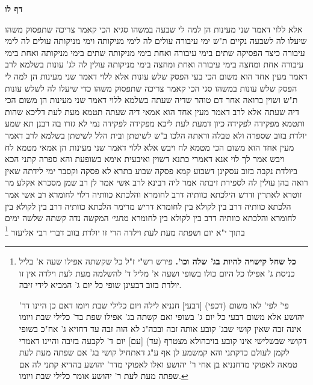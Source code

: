 \documentclass[12pt, openany]{book}
\newcommand{\sethebfont}{
\fontsize{10.5pt}{21.0pt} \selectfont
}
\newcommand{\twocol}[1]{
	{\sethebfont \begin{multicols}{2}
			#1
	\end{multicols}}	
}
\newcommand{\sectname}{}
\newcommand{\newsection}[1]{
	\addcontentsline{toc}{section}{#1}
	\renewcommand{\sectname}{#1}	
	\vspace{-\baselineskip}
	\begin{center}
		\textbf{%
\fontsize{16pt}{16pt}\selectfont
			#1}
	\end{center}
	\vspace{-\baselineskip}
	\nopagebreak
}
\newcommand{\footnotecomment}[1]{\footnote{#1}}
\newcommand{\commenta}[1]{\footnotecomment{#1}}
\begin{document}
\newsection{דף לו}
\twocol{אלא ללוי דאמר שני מעינות הן למה לי שבעה  במשהו סגיא 
הכי קאמר  צריכה שתפסוק משהו שיעלו לה לשבעה נקיים 
ת"ש  ימי עיבורה עולים לה לימי מניקותה וימי מניקותה עולים לה לימי עיבורה 
כיצד  הפסיקה שתים בימי עיבורה ואחת בימי מניקותה שתים בימי מניקותה ואחת בימי עיבורה אחת ומחצה בימי עיבורה ואחת ומחצה בימי מניקותה עולין לה לג' עונות 
בשלמא לרב דאמר מעין אחד הוא משום הכי בעי הפסק שלש עונות אלא ללוי דאמר שני מעינות הן למה לי הפסק שלש עונות  במשהו סגי 
הכי קאמר  צריכה שתפסוק משהו כדי שיעלו לה לשלש עונות 
ת"ש  ושוין ברואה אחר דם טוהר שדיה שעתה 
בשלמא ללוי דאמר שני מעינות הן משום הכי דיה שעתה אלא לרב דאמר מעין אחד הוא אמאי דיה שעתה  תטמא מעת לעת 
דליכא שהות 
ותטמא מפקידה לפקידה  כיון דמעת לעת ליכא מפקידה לפקידה נמי לא גזרו בה רבנן 
תא שמע  יולדת בזוב שספרה ולא טבלה וראתה הלכו ב"ש לשיטתן ובית הלל לשיטתן 
בשלמא לרב דאמר מעין אחד הוא משום הכי מטמא לח ויבש אלא ללוי דאמר שני מעינות הן אמאי מטמא לח ויבש 
אמר לך לוי  אנא דאמרי כתנא דשוין 
ואיבעית אימא  בשופעת  והא ספרה קתני 
הכא ביולדת נקבה בזוב עסקינן דשבוע קמא פסקה שבוע בתרא לא פסקה וקסבר  ימי לידתה שאין רואה בהן עולין לה לספירת זיבתה 
אמר ליה רבינא לרב אשי אמר לן רב שמן מסכרא אקלע מר זוטרא לאתרין ודרש  הילכתא כוותיה דרב לחומרא והלכתא כוותיה דלוי לחומרא 
רב אשי אמר  הלכתא כוותיה דרב בין לקולא בין לחומרא  דריש מרימר  הלכתא כוותיה דרב בין לקולא בין לחומרא  והלכתא כוותיה דרב בין לקולא בין לחומרא
{\large\emph{מתני׳}} המקשה נדה קשתה שלשה ימים בתוך י"א יום ושפתה מעת לעת וילדה הרי זו יולדת בזוב  דברי רבי אליעזר 
\commenta{\textbf{כל שחל קישויה להיות בג' שלה וכו'.}  פירש רש"י ז"ל כל שקשתה אפילו שעה א' בליל כניסת ג' אפילו כל היום כולו בשופי ושעה א' מליל ד' להשלמה מעת לעת וילדה אין זו יולדת בזוב דבעינן שופי כל יום ג' המביא לידי זיבה.\par  פי' לפי' לאו משום (דכפי) [דבעי] חנניא לילה ויום כלילי שבת ויומו דאם כן היינו דר' יהושע אלא משום דבעי כל יום ג' בשופי ואם קשתה בג' אפילו שפת בד' כלילי שבת ויומו אינה זבה שאין קושי שבג' קובע אותה זבה ובכה"ג לא הוה זבה עד דחזיא ג' אח"כ בשופי דקושי שבשלישי אינו קובע בזיבהולא מצטרף (עד) [עם] יום ד' לקבעה בזיבה והיינו דאמרי לקמן לעולם כדקתני והא קמשמע לן אף ע"ג דאתחיל קושי בג' אם שפתה מעת לעת טמאה לאפוקי מדחנניא בן אחי ר' יהושע ואלו לאפוקי מדר' יהושע בהדיא קתני לה אם שפתה מעת לעת ר' יהושע אומר כלילי שבת ויומו. }

}
\end{document}
